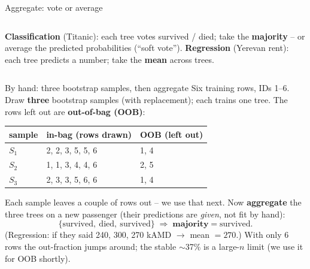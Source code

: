 \documentclass[aspectratio=169]{beamer}
\begin{document}
\begin{frame}{Aggregate: vote or average}
  \begin{columns}[T]
    \textbf{Classification} (Titanic): each tree votes survived / died; take the
    \textbf{majority} -- or average the predicted probabilities (``soft vote'').
    \textbf{Regression} (Yerevan rent): each tree predicts a number; take the
    \textbf{mean} across trees.
  \end{columns}
  \vfill
  \begin{center}
  \end{center}
  \vfill
\end{frame}

\begin{frame}{By hand: three bootstrap samples, then aggregate}
  Six training rows, IDs 1--6. Draw \textbf{three} bootstrap samples (with replacement);
  each trains one tree. The rows left out are \textbf{out-of-bag (OOB)}:
  \vskip 3pt
  \begin{center}\small
    \renewcommand{\arraystretch}{1.25}
    \begin{tabular}{l l l}
      sample & in-bag (rows drawn) & OOB (left out) \\
      \hline
      $S_1$ & 2, 2, 3, 5, 5, 6 & \textcolor{armred}{1, 4} \\
      $S_2$ & 1, 1, 3, 4, 4, 6 & \textcolor{armred}{2, 5} \\
      $S_3$ & 2, 3, 3, 5, 6, 6 & \textcolor{armred}{1, 4} \\
      \hline
    \end{tabular}
  \end{center}
  \vskip 4pt
  Each sample leaves a couple of rows out -- we use that next. Now \textbf{aggregate} the
  three trees on a new passenger (their predictions are \emph{given}, not fit by hand):
  \[
    \{\text{survived},\ \text{died},\ \text{survived}\}\;\Rightarrow\;\textbf{majority} = \text{survived}.
  \]
  \footnotesize (Regression: if they said 240, 300, 270 kAMD $\to$ mean $= 270$.) With only
  6 rows the out-fraction jumps around; the stable $\sim$37\% is a large-$n$ limit (we use it for OOB shortly).
\end{frame}
\end{document}
